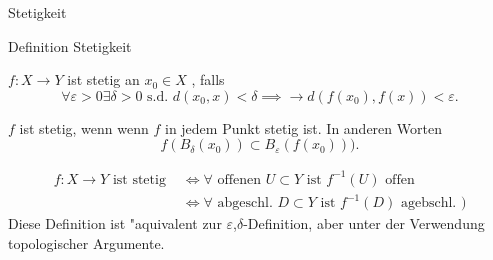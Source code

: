 \documentclass[class=article, crop=false]{standalone}
\begin{document}
\begin{zettel}{Stetigkeit}
\begin{flashcard}
\begin{question}
    Definition Stetigkeit
\end{question}

\vspace*{-8pt}
\begin{definition}[Stetigkeit]
    $f:X \longrightarrow Y$ ist stetig an $x_0 \in  X$ , falls
\[
    \forall \varepsilon >  0 \exists  \delta  > 0 \text{ s.d. }  d (x_0 , x) < \delta \implies \longrightarrow  d (f (x_0), f (x)) <  \varepsilon
.\]

    $f$ ist stetig, wenn wenn $f$ in jedem Punkt stetig ist.
    In anderen Worten
\[
    f (B_{\delta }(x_0)) \subset B_{\varepsilon } (f (x_0)) )
.\]
\end{definition}
\end{flashcard}

\begin{definition}[Stetigkeit]
\begin{align*}
    f:X \longrightarrow Y \text{ ist stetig }  &\iff \forall \text{ offenen } U \subset Y \text{ ist } f^{-1} (U) \text{ offen } \\
                                               & \iff \forall  \text{ abgeschl. } D \subset Y \text{ ist } f^{-1} (D) \text{ agebschl. } )
\end{align*}
    Diese Definition ist "aquivalent zur $\varepsilon $,$\delta$-Definition, aber unter der Verwendung topologischer Argumente.
\end{definition}

\end{zettel}
\end{document}
